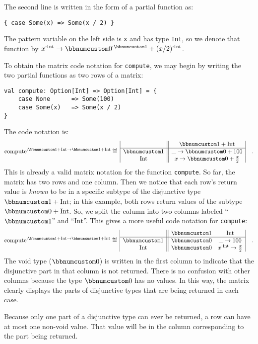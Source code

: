 The second line is written in the form of a partial function as:
\begin{lstlisting}
{ case Some(x) => Some(x / 2) }
\end{lstlisting}
The pattern variable on the left side is \lstinline!x! and has type
\lstinline!Int!, so we denote that function by $x^{:\text{Int}}\rightarrow\bbnum 0^{:\bbnum 1}+(x/2)^{:\text{Int}}$. 

To obtain the matrix code notation for \lstinline!compute!, we may
begin by writing the two partial functions as two rows of a matrix:
\begin{lstlisting}
val compute: Option[Int] => Option[Int] = {
    case None      => Some(100)
    case Some(x)   => Some(x / 2)
}
\end{lstlisting}
The code notation is:
\[
\text{compute}^{:\bbnum 1+\text{Int}\rightarrow\bbnum 1+\text{Int}}\triangleq\,\begin{array}{|c||c|}
 & \bbnum 1+\text{Int}\\
\hline \bbnum 1 & \_\rightarrow\bbnum 0+100\\
\text{Int} & x\rightarrow\bbnum 0+\frac{x}{2}
\end{array}\quad.
\]
This is already a valid matrix notation for the function \lstinline!compute!.
So far, the matrix has two rows and one column. Then we notice that
each row\textsf{'}s return value is \emph{known} to be in a specific subtype
of the disjunctive type $\bbnum 1+\text{Int}$; in this example, both
rows return values of the subtype $\bbnum 0+\text{Int}$. So, we split
the column into two columns labeled \textsf{``}$\bbnum 1$\textsf{''} and \textsf{``}$\text{Int}$\textsf{''}.
This gives a more useful code notation for \lstinline!compute!:
\[
\text{compute}^{:\bbnum 1+\text{Int}\rightarrow\bbnum 1+\text{Int}}\triangleq\,\begin{array}{|c||cc|}
 & \bbnum 1 & \text{Int}\\
\hline \bbnum 1 & \bbnum 0 & \_\rightarrow100\\
\text{Int} & \bbnum 0 & x^{:\text{Int}}\rightarrow\frac{x}{2}
\end{array}\quad.
\]
The void type ($\bbnum 0$) is
written in the first column to indicate that the disjunctive part
in that column is not returned. There is no confusion with other columns
because the type $\bbnum 0$ has no values. In this way, the matrix
clearly displays the parts of disjunctive types that are being returned
in each case.

Because only one part of a disjunctive type can ever be returned,
a row can have at most one non-void value. That value will be in the
column corresponding to the part being returned. 


